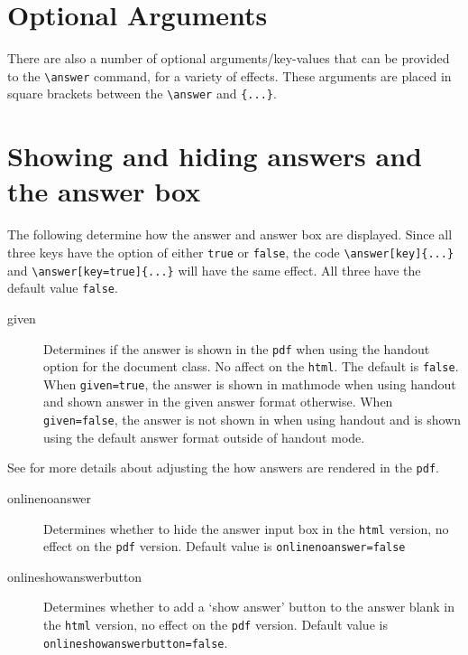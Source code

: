 \documentclass{ximera}
\begin{document}
        


    \section{Optional Arguments}
    
        There are also a number of optional arguments/key-values that can be provided to the \verb|\answer| command, for a variety of effects. These arguments are placed in square brackets between the \verb|\answer| and \verb|{...}|.

        \section{Showing and hiding answers and the answer box}
        The following determine how the answer and answer box are displayed. Since all three keys have the option of either \verb|true| or \verb|false|, the code \verb|\answer[key]{...}| and \verb|\answer[key=true]{...}| will have the same effect. All three have the default value \verb|false|.

        \begin{description}
            \item[given]  Determines if the answer is shown in the \verb|pdf| when using the handout option for the document class. No affect on the \verb|html|. The default is \verb|false|. 
            When \verb|given=true|, the answer is shown in mathmode when using handout and shown answer in the given answer format otherwise. When \verb|given=false|, the answer is not shown in when using handout and is shown using the default answer format outside of handout mode.
        \end{description}

        See  for more details about adjusting the how answers are rendered in the \verb|pdf|.
        
        \begin{description}
            \item[onlinenoanswer] Determines whether to hide the answer input box in the \verb|html| version, no effect on the \verb|pdf| version. Default value is \verb|onlinenoanswer=false|
            \item[onlineshowanswerbutton] Determines whether to add a `show answer' button to the answer blank in the \verb|html| version, no effect on the \verb|pdf| version. Default value is \verb|onlineshowanswerbutton=false|.
        \end{description}
\end{document}
